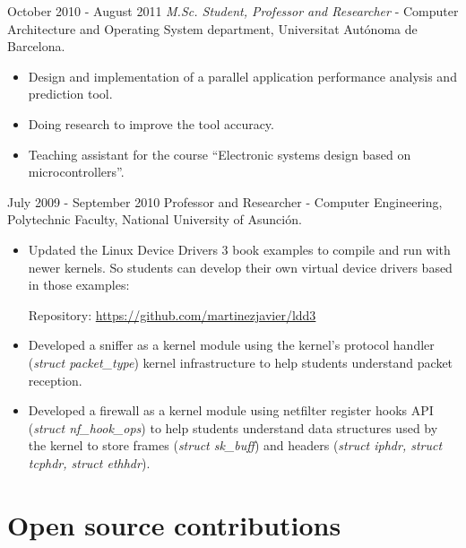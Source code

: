 \documentclass{simplecv}
\begin{document}
\begin{topic}
\item[October 2010 - August 2011] \emph{M.Sc. Student, Professor and Researcher} - Computer Architecture and Operating System department, Universitat Autónoma de Barcelona.

\begin{itemize}

\item Design and implementation of a parallel application performance analysis and prediction tool.

\item Doing research to improve the tool accuracy.

\item Teaching assistant for the course ``Electronic systems design based on microcontrollers''.

\end{itemize}

\item[July 2009 - September 2010] Professor and Researcher  - Computer Engineering, Polytechnic Faculty, National University of Asunción.

\begin{itemize}

\item Updated the Linux Device Drivers 3 book examples to compile and run with newer kernels. So students can develop their own virtual device drivers based in those examples:

Repository: \url{https://github.com/martinezjavier/ldd3}

\item Developed a sniffer as a kernel module using the kernel's protocol handler (\emph{struct packet\_type}) kernel infrastructure to help students understand packet reception.

\item Developed a firewall as a kernel module using netfilter register hooks API (\emph{struct nf\_hook\_ops}) to help students understand data structures used by the kernel to store frames (\emph{struct sk\_buff}) and headers (\emph{struct iphdr, struct tcphdr, struct ethhdr}).

\end{itemize}

\end{topic}

\section{Open source contributions}
\end{document}
